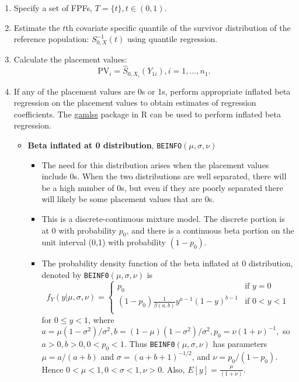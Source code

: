 \documentclass{article}
\newcommand{\be}{\beta}
\newcommand{\si}{\sigma}
\begin{document}
\begin{enumerate}
    \item Specify a set of FPFs, $T = \{t\}, t \in (0,1)$.
    \item Estimate the $t$th covariate specific quantile of the survivor distribution of the reference population: $S_{0, X}^{-1}(t)$ using quantile regression.
    \item Calculate the placement values:
    $$\text{PV}_i = \hat{S}_{0, X_i}(Y_{1i}), i = 1, \dots, n_1.$$
    \item If any of the placement values are 0s or 1s, perform appropriate inflated beta regression on the placement values to obtain estimates of regression coefficients. The \href{https://www.gamlss.com/wp-content/uploads/2018/01/DistributionsForModellingLocationScaleandShape.pdf}{\textsf{gamlss}} package in R can be used to perform inflated beta regression.
    \begin{itemize}
        \item \textbf{Beta inflated at 0 distribution}, \texttt{BEINFO}$(\mu, \si, \nu)$
        \begin{itemize}
            \item The need for this distribution arises when the placement values include 0s. When the two distributions are well separated, there will be a high number of 0s, but even if they are poorly separated there will likely be some placement values that are 0s.
            \item This is a discrete-continuous mixture model. The discrete portion is at 0 with probability $p_0$, and there is a continuous beta portion  on the unit interval (0,1) with probability $(1 - p_0)$. 
            \item The probability density function of the beta inflated at 0 distribution, denoted by \texttt{BEINF0}$(\mu, \si, \nu)$ is
            $$f_Y(y|\mu, \si, \nu) = \begin{cases}
            p_0 & \text{if $y = 0$} \\
            (1 - p_0)\frac{1}{\be(a,b)}y^{a - 1}(1 - y)^{b - 1} & \text{if $0 < y < 1$} \\
            \end{cases}$$ 
            for $0 \leq y < 1$, where $a = \mu(1 - \si^2)/\si^2, b = (1 - \mu)(1 - \si^2)/\si^2, p_0 = \nu(1 + \nu)^{-1},$ so $a > 0, b > 0, 0 < p_0 < 1$. Thus \texttt{BEINF0}$(\mu, \si, \nu)$ has parameters $\mu = a/(a+b)$ and $\si = (a + b + 1)^{-1/2}$, and $\nu = p_0/(1 - p_0)$. Hence $0 < \mu < 1, 0 < \si < 1, \nu > 0$. Also, $E[y] = \frac{\mu}{(1 + \nu)}$.

\end{itemize}
\end{itemize}
\end{enumerate}
\end{document}
